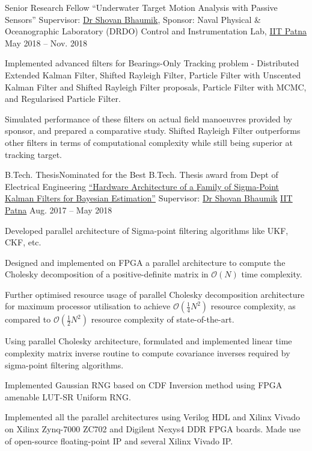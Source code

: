 \begin{cvexperience}
\cvposition
	{Senior Research Fellow} %
	{``Underwater Target Motion Analysis with Passive Sensors''} %
	{Supervisor: \href{http://www.tutorialpoint.org/ShovanBhaumik/index.html}{Dr Shovan Bhaumik}, Sponsor: Naval Physical \& Oceanographic Laboratory (DRDO)} %
	{Control and Instrumentation Lab, \href{https://www.iitp.ac.in}{IIT Patna}} %
	{May 2018 -- Nov. 2018} %
	{\begin{cvitems} %
		\item {Implemented advanced filters for Bearings-Only Tracking problem - Distributed Extended Kalman Filter, Shifted Rayleigh Filter, Particle Filter with Unscented Kalman Filter and Shifted Rayleigh Filter proposals, Particle Filter with MCMC, and Regularised Particle Filter.}
		\item {Simulated performance of these filters on actual field manoeuvres provided by sponsor, and prepared a comparative study. Shifted Rayleigh Filter outperforms other filters in terms of computational complexity while still being superior at tracking target.}
	\end{cvitems}}

\cvposition
	{B.Tech. Thesis\quad\textbar\quad Nominated for the Best B.Tech. Thesis award from Dept of Electrical Engineering} %
	{\href{https://github.com/haitmak/sigma}{``Hardware Architecture of a Family of Sigma-Point Kalman Filters for Bayesian Estimation''}} %
	{Supervisor: \href{http://www.tutorialpoint.org/ShovanBhaumik/index.html}{Dr Shovan Bhaumik}} %
	{\href{https://www.iitp.ac.in}{IIT Patna}} %
	{Aug. 2017 -- May 2018} %
	{\begin{cvitems} %
		\item {Developed parallel architecture of Sigma-point filtering algorithms like UKF, CKF, etc.}
		\item {Designed and implemented on FPGA a parallel architecture to compute the Cholesky decomposition of a positive-definite matrix in $\mathcal{O} \left( N \right)$ time complexity.}
		\item {Further optimised resource usage of parallel Cholesky decomposition architecture for maximum processor utilisation to achieve $\mathcal{O} \left( \frac{1}{4} N^2 \right)$ resource complexity, as compared to $\mathcal{O} \left( \frac{1}{2} N^2 \right)$ resource complexity of state-of-the-art.}
		\item {Using parallel Cholesky architecture, formulated and implemented linear time complexity matrix inverse routine to compute covariance inverses required by sigma-point filtering algorithms.}
		\item {Implemented Gaussian RNG based on CDF Inversion method using FPGA amenable LUT-SR Uniform RNG.}
		\item {Implemented all the parallel architectures using Verilog HDL and Xilinx Vivado on Xilinx Zynq-7000 ZC702 and Digilent Nexys4 DDR FPGA boards. Made use of open-source floating-point IP and several Xilinx Vivado IP.}
	\end{cvitems}}


\end{cvexperience}
